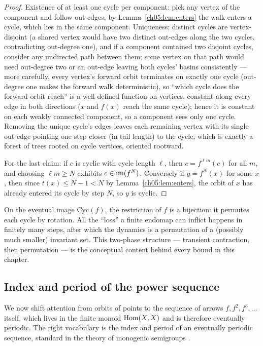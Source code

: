 \begin{proof}
Existence of at least one cycle per component: pick any vertex of the
component and follow out-edges; by Lemma~\ref{ch05:lem:enters} the walk
enters a cycle, which lies in the same component. Uniqueness: distinct
cycles are vertex-disjoint (a shared vertex would have two distinct
out-edges along the two cycles, contradicting out-degree one), and if a
component contained two disjoint cycles, consider any undirected path
between them; some vertex on that path would need out-degree two or an
out-edge leaving both cycles' basins consistently --- more carefully, every
vertex's forward orbit terminates on exactly one cycle (out-degree one makes
the forward walk deterministic), so ``which cycle does the forward orbit
reach'' is a well-defined function on vertices, constant along every edge in
both directions ($x$ and $f(x)$ reach the same cycle); hence it is constant
on each weakly connected component, so a component sees only one cycle.
Removing the unique cycle's edges leaves each remaining vertex with its
single out-edge pointing one step closer (in tail length) to the cycle,
which is exactly a forest of trees rooted on cycle vertices, oriented
rootward.

For the last claim: if $c$ is cyclic with cycle length $\ell$, then $c =
f^{\ell m}(c)$ for all $m$, and choosing $\ell m \ge N$ exhibits $c \in
\mathrm{im}(f^{N})$. Conversely if $y = f^{N}(x)$ for some $x$, then since
$t(x) \le N - 1 < N$ by Lemma~\ref{ch05:lem:enters}, the orbit of $x$ has
already entered its cycle by step $N$, so $y$ is cyclic.
\end{proof}

\begin{remark}
\label{ch05:rem:permutation}
On the eventual image $\mathrm{Cyc}(f)$, the restriction of $f$ is a
bijection: it permutes each cycle by rotation. All the ``loss'' a finite
endomap can inflict happens in finitely many steps, after which the dynamics
is a permutation of a (possibly much smaller) invariant set. This
two-phase structure --- transient contraction, then permutation --- is the
conceptual content behind every bound in this chapter.
\end{remark}

\subsection{Index and period of the power sequence}

We now shift attention from orbits of points to the sequence of arrows
$f, f^{2}, f^{3}, \dots$ itself, which lives in the finite monoid
$\mathrm{Hom}(X, X)$ and is therefore eventually periodic. The right vocabulary is
the index and period of an eventually periodic sequence, standard in the
theory of monogenic semigroups \cite{howie, pin}.

